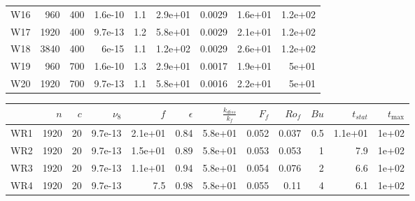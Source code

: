 \documentclass[a4paper]{article}
\begin{document}
\begin{tabular}{lrrrrrrrr}
W16 &   960 &  400 &  1.6e-10 &         1.1 &                 2.9e+01 & 0.0029 &     1.6e+01 &     1.2e+02 \\
W17 &  1920 &  400 &  9.7e-13 &         1.2 &                 5.8e+01 & 0.0029 &     2.1e+01 &     1.2e+02 \\
W18 &  3840 &  400 &    6e-15 &         1.1 &                 1.2e+02 & 0.0029 &     2.6e+01 &     1.2e+02 \\
W19 &   960 &  700 &  1.6e-10 &         1.3 &                 2.9e+01 & 0.0017 &     1.9e+01 &       5e+01 \\
W20 &  1920 &  700 &  9.7e-13 &         1.1 &                 5.8e+01 & 0.0016 &     2.2e+01 &       5e+01 \\
\bottomrule
\end{tabular}
\begin{tabular}{lrrrrrrrrrrr}
\toprule
{} &   $n$ &  $c$ &  $\nu_8$ &     $f$ &  $\epsilon$ &  $\frac{k_{diss}}{k_f}$ &  $F_f$ &  $Ro_f$ &  $Bu$ &  $t_{stat}$ &  $t_{\max}$ \\
\midrule
WR1 &  1920 &   20 &  9.7e-13 & 2.1e+01 &        0.84 &                 5.8e+01 &  0.052 &   0.037 &   0.5 &     1.1e+01 &       1e+02 \\
WR2 &  1920 &   20 &  9.7e-13 & 1.5e+01 &        0.89 &                 5.8e+01 &  0.053 &   0.053 &     1 &         7.9 &       1e+02 \\
WR3 &  1920 &   20 &  9.7e-13 & 1.1e+01 &        0.94 &                 5.8e+01 &  0.054 &   0.076 &     2 &         6.6 &       1e+02 \\
WR4 &  1920 &   20 &  9.7e-13 &     7.5 &        0.98 &                 5.8e+01 &  0.055 &    0.11 &     4 &         6.1 &       1e+02 \\
\bottomrule
\end{tabular}
\end{document}
